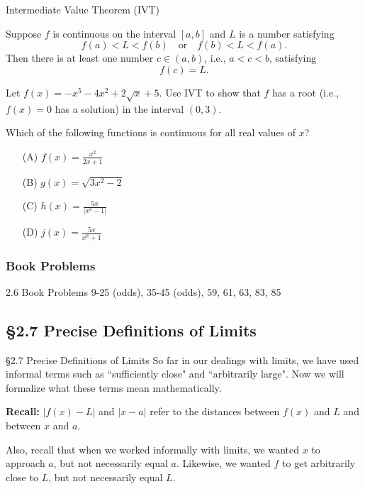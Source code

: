 \documentclass[Cal1Spr16Lectures.tex]{subfiles}
\begin{document}
\begin{frame}{\small Intermediate Value Theorem (IVT)}
\begin{thm} Suppose \alert{$f$ is continuous on the interval $[a,b]$} and $L$ is a number satisfying
\[f(a)<L<f(b)\quad\text{or}\quad f(b)<L<f(a).\]  
Then there is at least one number $c\in (a,b)$, i.e., $a<c<b$, satisfying 
\[f(c)=L.\] 
\end{thm}
\end{frame}

\begin{frame}
\begin{ex} Let $f(x)=-x^5-4x^2+2\sqrt{x}+5.$  Use IVT to show that $f$ has a root (i.e., $f(x)=0$ has a solution) in the interval $(0,3)$. \end{ex}
\end{frame}

\begin{frame}
\begin{exe} Which of the following functions is continuous for all real values of $x$?
\begin{itemize}
\item[(A)\;] $f(x)=\frac{x^2}{2x+1}$
\item[(B)\;] $g(x)=\sqrt{3x^2-2}$
\item[(C)\;] $h(x)=\frac{5x}{|x^8-1|}$
\item[(D)\;] $j(x)=\frac{5x}{x^8+1}$
\end{itemize}
\end{exe}
\end{frame}

\subsubsection{Book Problems}
\begin{frame}
\begin{block}{2.6 Book Problems} 9-25 (odds), 35-45 (odds), 59, 61, 63, 83, 85 \end{block} 
\end{frame}

\subsection[2.7 Precise Definitions of Limits]{\S 2.7 Precise Definitions of Limits}

\begin{frame}{\S 2.7 Precise Definitions of Limits}\small
So far in our dealings with limits, we have used informal terms such as ``sufficiently close" and ``arbitrarily large".  Now we will formalize what these terms mean mathematically.

\vspace{1pc}
\textbf{Recall:} $|f(x)-L|$ and $|x-a|$ refer to the distances between $f(x)$ and $L$ and between $x$ and $a$.

\vspace{1pc}
Also, recall that when we worked informally with limits, we wanted $x$ to approach $a$, \alert{but not necessarily equal $a$}.  Likewise, we wanted $f$ to get arbitrarily close to $L$, but not necessarily equal $L$.
\end{frame}
\end{document}
